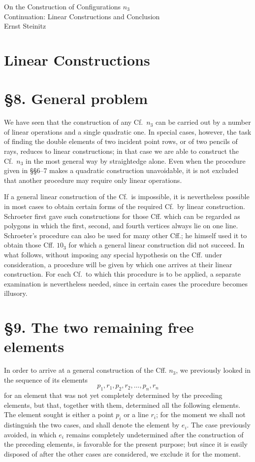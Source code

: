 \documentclass[11pt]{article}
\newcommand{\Cf}{\textup{Cf.}}
\begin{document}
\begin{center}
{\Large On the Construction of Configurations $n_3$}\\[0.4em]
{\large Continuation: Linear Constructions and Conclusion}\\[0.3em]
{\normalsize Ernst Steinitz}
\end{center}


\section*{Linear Constructions}
\section*{\S 8. General problem}
We have seen that the construction of any \Cf\ $n_3$ can be carried out by a number of linear operations and a single quadratic one. In special cases, however, the task of finding the double elements of two incident point rows, or of two pencils of rays, reduces to linear constructions; in that case we are able to construct the \Cf\ $n_3$ in the most general way by straightedge alone. Even when the procedure given in \S\S 6--7 makes a quadratic construction unavoidable, it is not excluded that another procedure may require only linear operations.

If a general linear construction of the \Cf\ is impossible, it is nevertheless possible in most cases to obtain certain forms of the required \Cf\ by linear construction. Schroeter first gave such constructions for those Cff. which can be regarded as polygons in which the first, second, and fourth vertices always lie on one line. Schroeter's procedure can also be used for many other Cff.; he himself used it to obtain those Cff. $10_3$ for which a general linear construction did not succeed. In what follows, without imposing any special hypothesis on the Cff. under consideration, a procedure will be given by which one arrives at their linear construction. For each \Cf\ to which this procedure is to be applied, a separate examination is nevertheless needed, since in certain cases the procedure becomes illusory.

\section*{\S 9. The two remaining free elements}
In order to arrive at a general construction of the Cff. $n_3$, we previously looked in the sequence of its elements
\[
p_1,r_1,p_2,r_2,\ldots,p_n,r_n
\]
for an element that was not yet completely determined by the preceding elements, but that, together with them, determined all the following elements. The element sought is either a point $p_i$ or a line $r_i$; for the moment we shall not distinguish the two cases, and shall denote the element by $e_i$. The case previously avoided, in which $e_i$ remains completely undetermined after the construction of the preceding elements, is favorable for the present purpose; but since it is easily disposed of after the other cases are considered, we exclude it for the moment.
\end{document}
